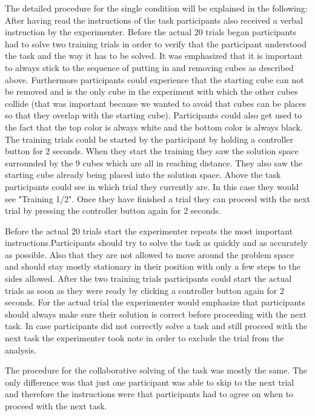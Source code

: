 \documentclass{article}
\begin{document}
The detailed procedure for the single condition will be explained in the following:
After having read the instructions of the task participants also received a verbal instruction by the experimenter. Before the actual 20 trials began participants had to solve two training trials in order to verify that the participant understood the task and the way it has to be solved. It was emphasized that it is important to always stick to the sequence of putting in and removing cubes as described above. Furthermore participants could experience that the starting cube can not be removed and is the only cube in the experiment with which the other cubes collide (that was important because we wanted to avoid that cubes can be places so that they overlap with the starting cube). Participants could also get used to the fact that the top color is always white and the bottom color is always black. The training trials could be started by the participant by holding a controller button for 2 seconds. When they start the training they saw the solution space surrounded by the 9 cubes which are all in reaching distance. They also saw the starting cube already being placed into the solution space. Above the task participants could see in which trial they currently are. In this case they would see "Training 1/2". Once they have finished a trial they can proceed with the next trial by pressing the controller button again for 2 seconds. 

Before the actual 20 trials start the experimenter repeats the most important instructions.Participants should try to solve the task as quickly and as accurately as possible. Also that they are not allowed to move around the problem space and should stay mostly stationary in their position with only a few steps to the sides allowed.
After the two training trials participants could start the actual trials as soon as they were ready by clicking a controller button again for 2 seconds. For the actual trial the experimenter would emphasize that participants should always make sure their solution is correct before proceeding with the next task. In case participants did not correctly solve a task and still proceed with the next task the experimenter took note in order to exclude the trial from the analysis.

The procedure for the collaborative solving of the task was mostly the same. The only difference was that just one participant was able to skip to the next trial and therefore the instructions were that participants had to agree on when to proceed with the next task.
\end{document}
